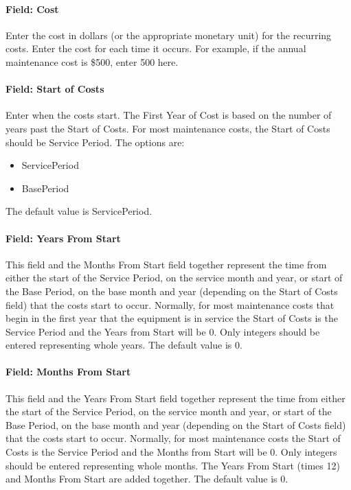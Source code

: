 \paragraph{Field: Cost}\label{field-cost-000}

Enter the cost in dollars (or the appropriate monetary unit) for the recurring costs. Enter the cost for each time it occurs. For example, if the annual maintenance cost is \$500, enter 500 here.

\paragraph{Field: Start of Costs}\label{field-start-of-costs-000}

Enter when the costs start. The First Year of Cost is based on the number of years past the Start of Costs. For most maintenance costs, the Start of Costs should be Service Period. The options are:

\begin{itemize}
\item
  ServicePeriod
\item
  BasePeriod
\end{itemize}

The default value is ServicePeriod.

\paragraph{Field: Years From Start}\label{field-years-from-start-000}

This field and the Months From Start field together represent the time from either the start of the Service Period, on the service month and year, or start of the Base Period, on the base month and year (depending on the Start of Costs field) that the costs start to occur. Normally, for most maintenance costs that begin in the first year that the equipment is in service the Start of Costs is the Service Period and the Years from Start will be 0. Only integers should be entered representing whole years. The default value is 0.

\paragraph{Field: Months From Start}\label{field-months-from-start-000}

This field and the Years From Start field together represent the time from either the start of the Service Period, on the service month and year, or start of the Base Period, on the base month and year (depending on the Start of Costs field) that the costs start to occur. Normally, for most maintenance costs the Start of Costs is the Service Period and the Months from Start will be 0. Only integers should be entered representing whole months. The Years From Start (times 12) and Months From Start are added together. The default value is 0.

